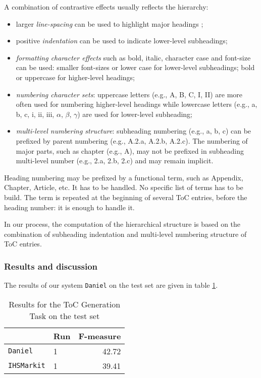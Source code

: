 A combination of contrastive effects usually reflects the hierarchy:
\begin{itemize}
    \item larger \emph{line-spacing} can be used to highlight major headings ;
    \item positive \emph{indentation} can be used to indicate lower-level subheadings;
    \item \emph{formatting character effects} such as bold, italic, character case and font-size can be used: smaller font-sizes or lower case for lower-level subheadings; bold or uppercase for higher-level headings;
    \item \emph{numbering character sets}: uppercase letters (e.g., A, B, C, I, II)  are more often used for numbering higher-level headings while lowercase letters (e.g., a, b, c, i, ii, iii, $\alpha$, $\beta$, $\gamma$) are used for lower-level subheading;
    \item \emph{multi-level numbering structure}: subheading numbering (e.g., a, b, c) can be prefixed by parent numbering (e.g., A.2.a, A.2.b, A.2.c). The numbering of major parts, such as chapter (e.g., A), may not be prefixed in subheading multi-level number (e.g., 2.a, 2.b, 2.c) and may remain implicit.
\end{itemize}
 
Heading numbering may be prefixed by a functional term, such as Appendix, Chapter, Article, etc. It has to be handled. No specific list of terms has to be build. The term is repeated at the beginning of several ToC entries, before the heading number: it is enough to handle it.

In our process, the computation of the hierarchical structure is based on the combination of subheading indentation and multi-level numbering structure of ToC entries.

\subsubsection{Results and discussion}

The results of our system \texttt{Daniel} on the test set are given in table \ref{res:toc}.   

\begin{table}
\begin{tabular}{l|l|r}
     & Run & F-measure\\\hline
\texttt{Daniel}  & 1 &      42.72\\\hline
\texttt{IHSMarkit} & 1 &   39.41
\end{tabular}
\caption{Results for the ToC Generation Task on the test set}
\label{res:toc}
\end{table}

